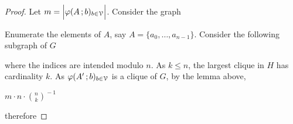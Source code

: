\documentclass[scombinatorics.tex]{subfiles}
\begin{document}
\begin{proof}
   Let $m=\Big|\varphi(A\,;b)_{b\in\EuScript V}\Big|$.
   Consider the graph 
   
   

   Enumerate the elements of $A$, say $A=\{a_0,\dots,a_{n-1}\}$.
   Consider the following subgraph of $G$ 
   

   where the indices are intended modulo $n$.
   As $k\le n$, the largest clique in $H$ has cardinality $k$.
   As $\varphi(A'\,;b)_{b\in\EuScript V}$ is a clique of $G$, by the lemma above, 

   \medrel{=}$\displaystyle m\cdot n\cdot {n\choose k}^{\!-1}$
   
   therefore

\end{proof}
\end{document}
